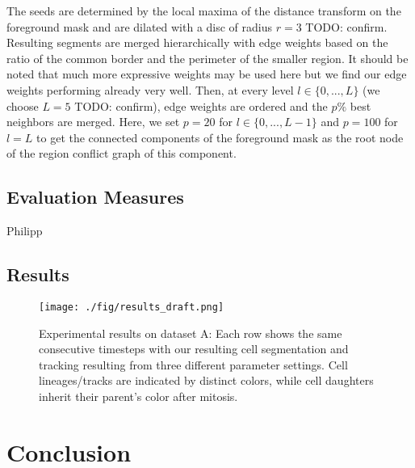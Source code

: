 \documentclass[10pt,twocolumn,letterpaper]{article}
\newcommand{\red}{\color{red}}
\begin{document}
The seeds are determined by the local maxima of the distance transform on the foreground mask 
and are dilated with a disc of radius
$r=3$ {\red TODO: confirm}. Resulting segments are merged hierarchically with edge weights based on 
the ratio of the common border and the perimeter of the smaller region. It should be noted that 
much more expressive weights may be used here but we find our edge weights performing already very well.
Then, at every level $l\in \{0,...,L\}$ (we choose $L=5$ {\red TODO: confirm}), edge weights are ordered and the $p \%$ best neighbors
are merged. Here, we set $p=20$ for $l \in \{0,...,L-1\}$ and $p=100$ for $l=L$ to get the connected components 
of the foreground mask as the root node of the region conflict graph of this component.


\subsection{Evaluation Measures}
\label{sec:measures}

{\red Philipp}

\subsection{Results}
\label{sec:results}

\begin{figure*}[t]
\begin{center}
\texttt{[image: ./fig/results\_draft.png]}
\end{center}
   \caption{Experimental results on dataset A: Each row shows the same consecutive timesteps with our resulting cell 
segmentation and tracking resulting from three different parameter settings. 
Cell lineages/tracks are indicated by distinct colors, while cell daughters inherit their parent's color after mitosis.
}
\label{fig:results}
\end{figure*}

\section{Conclusion}
\label{sec:conclusion}

{\small


}
\end{document}
